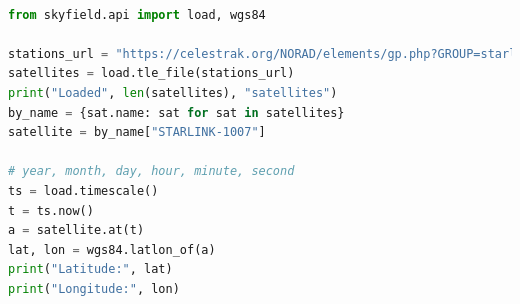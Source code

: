\documentclass[IN,11pt,twoside,openright,idp,english]{tumthesis}
\begin{document}
\begin{lstlisting}[language=python,caption={retrieving a Satellite's position using the Satname},captionpos=b]

from skyfield.api import load, wgs84

stations_url = "https://celestrak.org/NORAD/elements/gp.php?GROUP=starlink&FORMAT=tle"
satellites = load.tle_file(stations_url)
print("Loaded", len(satellites), "satellites")
by_name = {sat.name: sat for sat in satellites}
satellite = by_name["STARLINK-1007"]

# year, month, day, hour, minute, second
ts = load.timescale()
t = ts.now()
a = satellite.at(t)
lat, lon = wgs84.latlon_of(a)
print("Latitude:", lat)
print("Longitude:", lon)
\end{lstlisting}

\clearpage
\pagestyle{thesischapter}
\cleardoublepage
{}
\listoffigures
\listoftables
\printbibliography[heading=bibintoc]
\clearpage
\pagestyle{empty}
\end{document}
